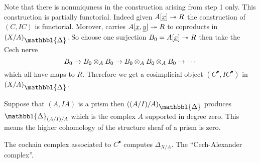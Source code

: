 \documentclass[12pt]{article}
\newcommand{\Prism}{{\mathlarger{\mathbbl{\Delta}}}}
\begin{document}
Note that there is nonuniquness in the construction arising from step 1 only. This construction is partially functorial. Indeed given $A[ \underline{x} ] \twoheadrightarrow R$ the construction of $(C, IC)$ is functorial. Morover, carries $A[ \underline{x}, \underline{y}] \twoheadrightarrow R$ to coproducts in $(X/A)_{\Prism}$.  So choose one surjection $B_0 = A[\underline{x}] \twoheadrightarrow R$ then take the Cech nerve 
\[ B_0 \to B_0 \otimes_A B_0 \to B_0 \otimes_A B_0 \otimes_A B_0 \to \cdots \]
which all have maps to $R$. Therefore we get a cosimplicial object $(C^\bullet, I C^\bullet)$ in $(X/A)_{\Prism}$. 

\begin{lemma}
Suppose that $(A, IA)$ is a prism then $((A/I)/A)_{\Prism}$ produces $\Prism_{(A/I)/A}$ which is the complex $A$ supported in degree zero. This means the higher cohomology of the structure sheaf of a prism is zero. 
\end{lemma}

\begin{prop}
The cochain complex associated to $C^\bullet$ computes $\Delta_{X/A}$. The ``Cech-Alexander complex''. 
\end{prop}
\end{document}
